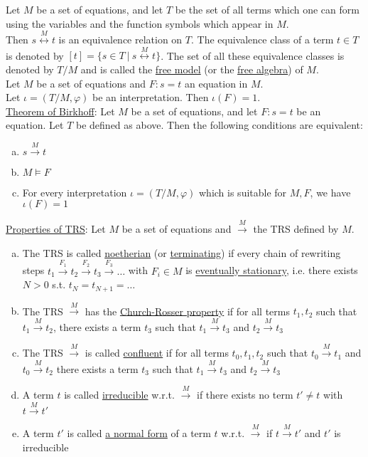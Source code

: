 \documentclass[a4paper]{article}
\newcommand{\ul}{\underline}
\let\phi\varphi
\begin{document}
Let $M$ be a set of equations, and let $T$ be the set of all terms which one can form using the variables and the function symbols which appear in $M$.\\
Then $s\overset{M}{\leftrightarrow}t$ is an equivalence relation on $T$. The equivalence class of a term $t\in T$ is denoted by $\left[t\right]=\{s\in T\ \vert\ s\overset{M}{\leftrightarrow}t\}$. The set of all these equivalence classes is denoted by $T/M$ and is called the \ul{free model} (or the \ul{free algebra}) of $M$.\\
Let $M$ be a set of equations and $F:s=t$ an equation in $M$.\\
Let $\iota=(T/M,\phi)$ be an interpretation. Then $\iota(F)=1$.\\
\ul{Theorem of Birkhoff}: Let $M$ be a set of equations, and let $F:s=t$ be an equation. Let $T$ be defined as above. Then the following conditions are equivalent:
\begin{enumerate}[(a)]
	\item $s\overset{M}{\rightarrow}t$
	\item $M\models F$
	\item For every interpretation $\iota=(T/M,\phi)$ which is suitable for $M,F$, we have $\iota(F)=1$
\end{enumerate}
\ul{Properties of TRS}: Let $M$ be a set of equations and $\overset{M}{\rightarrow}$ the TRS defined by $M$.
\begin{enumerate}[(a)]
	\item The TRS is called \ul{noetherian} (or \ul{terminating}) if every chain of rewriting steps $t_1\overset{F_1}{\rightarrow}t_2\overset{F_2}{\rightarrow}t_3\overset{F_3}{\rightarrow}\dots$ with $F_i\in M$ is \ul{eventually stationary}, i.e. there exists $N>0$ s.t. $t_N=t_{N+1}=\dots$
	\item The TRS $\overset{M}{\rightarrow}$ has the \ul{Church-Rosser property} if for all terms $t_1,t_2$ such that $t_1\overset{M}{\rightarrow}t_2$, there exists a term $t_3$ such that $t_1\overset{M}{\rightarrow}t_3$ and $t_2\overset{M}{\rightarrow}t_3$
	\item The TRS $\overset{M}{\rightarrow}$ is called \ul{confluent} if for all terms $t_0,t_1,t_2$ such that $t_0\overset{M}{\rightarrow}t_1$ and $t_0\overset{M}{\rightarrow}t_2$ there exists a term $t_3$ such that $t_1\overset{M}{\rightarrow}t_3$ and $t_2\overset{M}{\rightarrow}t_3$
	\item A term $t$ is called \ul{irreducible} w.r.t. $\overset{M}{\rightarrow}$ if there exists no term $t'\neq t$ with $t\overset{M}{\rightarrow}t'$
	\item A term $t'$ is called \ul{a normal form} of a term $t$ w.r.t. $\overset{M}{\rightarrow}$ if $t\overset{M}{\rightarrow}t'$ and $t'$ is irreducible
\end{enumerate}
\end{document}
